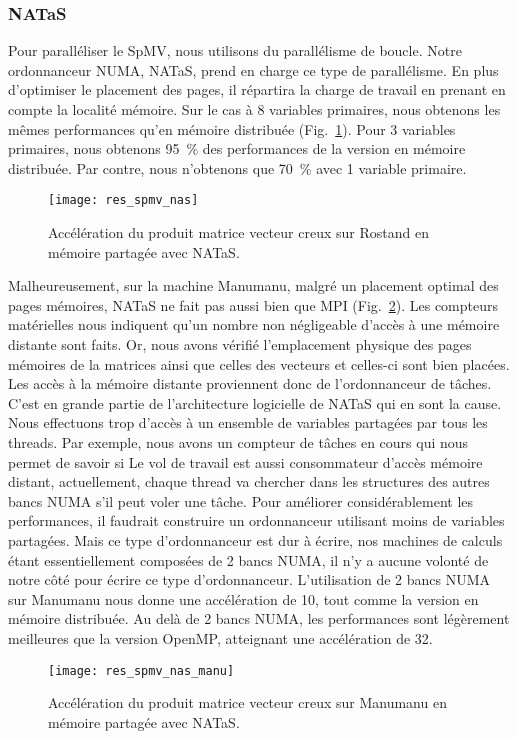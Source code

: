 \subsubsection{NATaS}
Pour paralléliser le SpMV, nous utilisons du parallélisme de boucle.
%
Notre ordonnanceur NUMA, NATaS, prend en charge ce type de parallélisme.
%
En plus d'optimiser le placement des pages, il répartira la charge de travail en prenant en compte la localité mémoire.
%
Sur le cas à 8 variables primaires, nous obtenons les mêmes performances qu'en mémoire distribuée (Fig.~\ref{fig:res_spmv_nas}).
%
Pour 3 variables primaires, nous obtenons 95~\% des performances de la version en mémoire distribuée.
%
Par contre, nous n'obtenons que 70~\% avec 1 variable primaire.

\begin{figure}[t!]
  \centering
  \texttt{[image: res\_spmv\_nas]}
  \caption{Accélération du produit matrice vecteur creux sur Rostand en mémoire partagée avec NATaS.}
  \label{fig:res_spmv_nas}
\end{figure}


Malheureusement, sur la machine Manumanu, malgré un placement optimal des pages mémoires, NATaS ne fait pas aussi bien que MPI (Fig.~\ref{fig:res_spmv_nas_manumanu}).
%
Les compteurs matérielles nous indiquent qu'un nombre non négligeable d'accès à une mémoire distante sont faits.
%
Or, nous avons vérifié l'emplacement physique des pages mémoires de la matrices ainsi que celles des vecteurs et celles-ci sont bien placées.
%
Les accès à la mémoire distante proviennent donc de l'ordonnanceur de tâches.
%
C'est en grande partie de l'architecture logicielle de NATaS qui en sont la cause.
%
Nous effectuons trop d'accès à un ensemble de variables partagées par tous les threads.
%
Par exemple, nous avons un compteur de tâches en cours qui nous permet de savoir si
%
Le vol de travail est aussi consommateur d'accès mémoire distant, actuellement, chaque thread va chercher dans les structures des autres bancs NUMA s'il peut voler une tâche.
%
Pour améliorer considérablement les performances, il faudrait construire un ordonnanceur utilisant moins de variables partagées.
%
Mais ce type d'ordonnanceur est dur à écrire, nos machines de calculs étant essentiellement composées de 2 bancs NUMA, il n'y a aucune volonté de notre côté pour écrire ce type d'ordonnanceur.
%
L'utilisation de 2 bancs NUMA sur Manumanu nous donne une accélération de 10, tout comme la version en mémoire distribuée.
%
Au delà de 2 bancs NUMA, les performances sont légèrement meilleures que la version OpenMP, atteignant une accélération de 32.

\begin{figure}[t!]
  \centering
  \texttt{[image: res\_spmv\_nas\_manu]}
  \caption{Accélération du produit matrice vecteur creux sur Manumanu en mémoire partagée avec NATaS.}
  \label{fig:res_spmv_nas_manumanu}
\end{figure}
